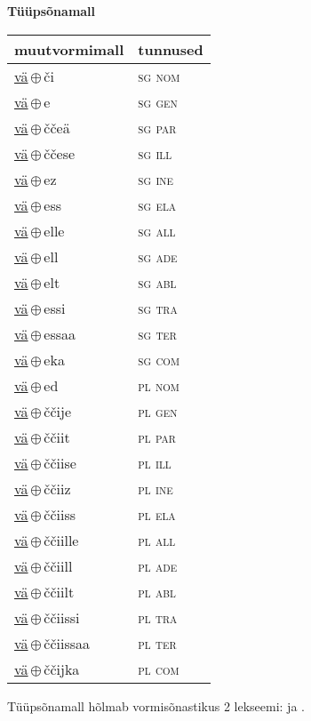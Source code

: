 

\vspace{3.5em}
\noindent \begin{minipage}{\textwidth}
\noindent \textbf{Tüüpsõnamall \,}\\

\begin{sideways}
\begin{tabular}{l l}
muutvormimall & tunnused \\
\hline
\underline{vä}\,$\oplus$\,či & \textsc{ sg nom } \\
\underline{vä}\,$\oplus$\,e & \textsc{ sg gen } \\
\underline{vä}\,$\oplus$\,ččeä & \textsc{ sg par } \\
\underline{vä}\,$\oplus$\,ččese & \textsc{ sg ill } \\
\underline{vä}\,$\oplus$\,ez & \textsc{ sg ine } \\
\underline{vä}\,$\oplus$\,ess & \textsc{ sg ela } \\
\underline{vä}\,$\oplus$\,elle & \textsc{ sg all } \\
\underline{vä}\,$\oplus$\,ell & \textsc{ sg ade } \\
\underline{vä}\,$\oplus$\,elt & \textsc{ sg abl } \\
\underline{vä}\,$\oplus$\,essi & \textsc{ sg tra } \\
\underline{vä}\,$\oplus$\,essaa & \textsc{ sg ter } \\
\underline{vä}\,$\oplus$\,eka & \textsc{ sg com } \\
\underline{vä}\,$\oplus$\,ed & \textsc{ pl nom } \\
\underline{vä}\,$\oplus$\,ččije & \textsc{ pl gen } \\
\underline{vä}\,$\oplus$\,ččiit & \textsc{ pl par } \\
\underline{vä}\,$\oplus$\,ččiise & \textsc{ pl ill } \\
\underline{vä}\,$\oplus$\,ččiiz & \textsc{ pl ine } \\
\underline{vä}\,$\oplus$\,ččiiss & \textsc{ pl ela } \\
\underline{vä}\,$\oplus$\,ččiille & \textsc{ pl all } \\
\underline{vä}\,$\oplus$\,ččiill & \textsc{ pl ade } \\
\underline{vä}\,$\oplus$\,ččiilt & \textsc{ pl abl } \\
\underline{vä}\,$\oplus$\,ččiissi & \textsc{ pl tra } \\
\underline{vä}\,$\oplus$\,ččiissaa & \textsc{ pl ter } \\
\underline{vä}\,$\oplus$\,ččijka & \textsc{ pl com } \\
\end{tabular}
\end{sideways}
\label{tab:tüüpsõnamall-väči}

\end{minipage}

 
\vspace{1em}
\noindent Tüüpsõnamall  hõlmab vormisõnastikus 2 lekseemi:  ja .
